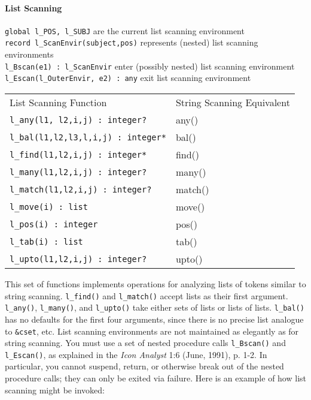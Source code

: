 \paragraph{List Scanning}
\texttt{global l\_POS, l\_SUBJ} are the current list scanning
environment\\
\texttt{record l\_ScanEnvir(subject,pos)} represents (nested) list
scanning environments\\
\texttt{l\_Bscan(e1) : l\_ScanEnvir} enter (possibly nested) list
scanning environment\\
\texttt{l\_Escan(l\_OuterEnvir, e2) : any} exit list scanning
environment

\begin{supertabular}{m{3in} m{2in}}
List Scanning Function & String Scanning Equivalent \\

\texttt{l\_any(l1, l2,i,j) : integer?} & any()\\
\texttt{l\_bal(l1,l2,l3,l,i,j) : integer*} & bal()\\
\texttt{l\_find(l1,l2,i,j) : integer*} & find()\\
\texttt{l\_many(l1,l2,i,j) : integer?} &  many()\\
\texttt{l\_match(l1,l2,i,j) : integer?} &  match()\\
\texttt{l\_move(i) : list} & move()\\
\texttt{l\_pos(i) : integer} & pos()\\
\texttt{l\_tab(i) : list} & tab()\\
\texttt{l\_upto(l1,l2,i,j) : integer?} & upto()\\
\end{supertabular}

This set of functions implements operations for analyzing lists of
tokens similar to string scanning. \texttt{l\_find()} and
\texttt{l\_match()} accept lists as their first argument.
\texttt{l\_any()}, \texttt{l\_many()}, and \texttt{l\_upto()} take
either sets of lists or lists of lists. \texttt{l\_bal()} has no
defaults for the first four arguments, since there is no precise list
analogue to \texttt{\&cset}, etc. List scanning environments are not
maintained as elegantly as for string scanning. You must use a set of
nested procedure calls \texttt{l\_Bscan()} and \texttt{l\_Escan()}, as
explained in the \textit{Icon Analyst} 1:6 (June, 1991), p. 1-2. In
particular, you cannot suspend, return, or otherwise break out of the
nested procedure calls; they can only be exited via failure. Here is an
example of how list scanning might be invoked:

